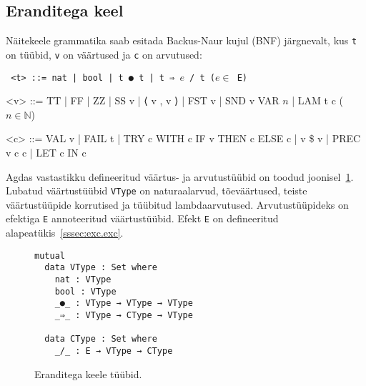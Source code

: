 \documentclass[a4paper,12pt]{article}
\begin{document}
\subsection{Eranditega keel}\label{ssec:exc.raw}

Näitekeele grammatika saab esitada Backus-Naur kujul (BNF) järgnevalt, kus {\tt t} on tüübid, {\tt v} on väärtused ja {\tt c} on arvutused:
\begin{adjustwidth}{1em}{0pt}
\begin{grammar}\tt
<t> ::= nat | bool | t ● t | t ⇒ $e$ / t \hfill ($e \in$ E)
  
<v> ::= TT | FF | ZZ | SS v | ⟨ v , v ⟩ | FST v | SND v
    \alt VAR $n$ | LAM t c \hfill ($n \in \mathbb N$)
  
<c> ::= VAL v | FAIL t | TRY c WITH c
    \alt IF v THEN c ELSE c | v \$ v | PREC v c c | LET c IN c
\end{grammar}
\end{adjustwidth}
Agdas vastastikku defineeritud väärtus- ja arvutustüübid on toodud joonisel~\ref{fig:exc.types}.
Lubatud väärtustüübid {\tt VType} on naturaalarvud, tõeväärtused, teiste väärtustüüpide korrutised ja tüübitud lambdaarvutused.
Arvutustüüpideks on efektiga {\tt E} annoteeritud väärtustüübid. Efekt {\tt E} on defineeritud alapeatükis~\ref{sssec:exc.exc}.
\begin{figure}
  \begin{BVerbatim}
mutual
  data VType : Set where
    nat : VType
    bool : VType
    _●_ : VType → VType → VType
    _⇒_ : VType → CType → VType

  data CType : Set where
    _/_ : E → VType → CType
  \end{BVerbatim}
  \caption{Eranditega keele tüübid.}
  \label{fig:exc.types}
\end{figure}
\end{document}
